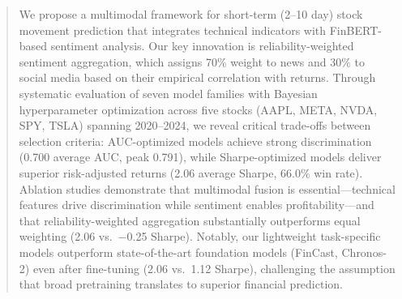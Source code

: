 \documentclass[a4paper,10pt,conference]{IEEEtran}
\begin{document}
\begin{abstract}
We propose a multimodal framework for short-term (2--10 day) stock movement prediction that integrates technical indicators with FinBERT-based sentiment analysis. Our key innovation is reliability-weighted sentiment aggregation, which assigns 70\% weight to news and 30\% to social media based on their empirical correlation with returns. Through systematic evaluation of seven model families with Bayesian hyperparameter optimization across five stocks (AAPL, META, NVDA, SPY, TSLA) spanning 2020--2024, we reveal critical trade-offs between selection criteria: AUC-optimized models achieve strong discrimination (0.700 average AUC, peak 0.791), while Sharpe-optimized models deliver superior risk-adjusted returns (2.06 average Sharpe, 66.0\% win rate). Ablation studies demonstrate that multimodal fusion is essential---technical features drive discrimination while sentiment enables profitability---and that reliability-weighted aggregation substantially outperforms equal weighting (2.06 vs.\ $-$0.25 Sharpe). Notably, our lightweight task-specific models outperform state-of-the-art foundation models (FinCast, Chronos-2) even after fine-tuning (2.06 vs.\ 1.12 Sharpe), challenging the assumption that broad pretraining translates to superior financial prediction.
\end{abstract}
\end{document}
